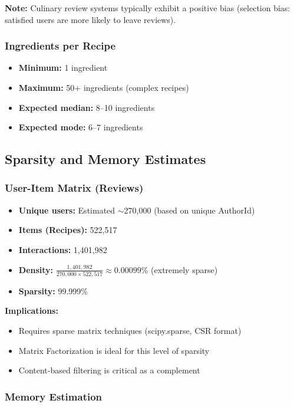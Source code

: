 \documentclass[11pt,a4paper]{article}
\begin{document}
\textbf{Note:} Culinary review systems typically exhibit a positive bias (selection bias: satisfied users are more likely to leave reviews).

\subsubsection{Ingredients per Recipe}

\begin{itemize}
    \item \textbf{Minimum:} 1 ingredient
    \item \textbf{Maximum:} 50+ ingredients (complex recipes)
    \item \textbf{Expected median:} 8--10 ingredients
    \item \textbf{Expected mode:} 6--7 ingredients
\end{itemize}

\subsection{Sparsity and Memory Estimates}

\subsubsection{User-Item Matrix (Reviews)}

\begin{itemize}
    \item \textbf{Unique users:} Estimated $\sim$270,000 (based on unique AuthorId)
    \item \textbf{Items (Recipes):} 522,517
    \item \textbf{Interactions:} 1,401,982
    \item \textbf{Density:} $\frac{1,401,982}{270,000 \times 522,517} \approx 0.00099\%$ (extremely sparse)
    \item \textbf{Sparsity:} 99.999\%
\end{itemize}

\textbf{Implications:}
\begin{itemize}
    \item Requires sparse matrix techniques (scipy.sparse, CSR format)
    \item Matrix Factorization is ideal for this level of sparsity
    \item Content-based filtering is critical as a complement
\end{itemize}

\subsubsection{Memory Estimation}
\end{document}
